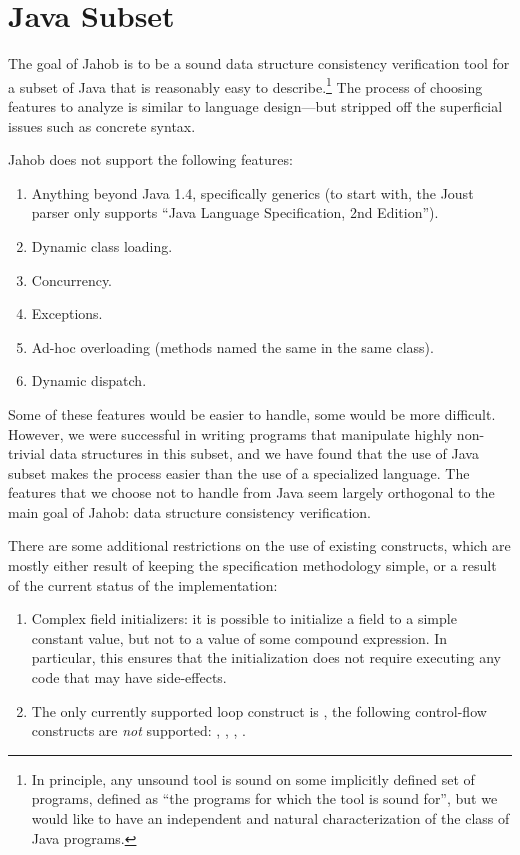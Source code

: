 \section{Java Subset}
\label{sec:javaSubset}

The goal of Jahob is to be a sound data structure consistency
verification tool for a subset of Java that is reasonably easy to
describe.\footnote{In principle, any unsound tool is sound on some
implicitly defined set of programs, defined as ``the programs for
which the tool is sound for'', but we would like to have an
independent and natural characterization of the class of Java
programs.}  The process of choosing features to analyze is similar to
language design---but stripped off the superficial issues such as
concrete syntax.

Jahob does not support the following features:
\begin{enumerate}
\item Anything beyond Java 1.4, specifically generics (to start with,
the Joust parser only supports ``Java Language Specification, 2nd Edition'').
\item Dynamic class loading.
\item Concurrency.
\item Exceptions.
\item Ad-hoc overloading (methods named the same in the same class).
\item Dynamic dispatch.
\end{enumerate}
Some of these features would be easier to handle, some would be more
difficult.  However, we were successful in writing programs that
manipulate highly non-trivial data structures in this subset, and we
have found that the use of Java subset makes the process easier than
the use of a specialized language.  The features that we choose not to
handle from Java seem largely orthogonal to the main goal of Jahob:
data structure consistency verification.

There are some additional restrictions on the use of
existing constructs, which are mostly either result of
keeping the specification methodology simple, or a result of
the current status of the implementation:
\begin{enumerate}
\item Complex field initializers: it is possible to initialize
a field to a simple constant value, but not to a value of some
compound expression.  In particular, this ensures that the initialization
does not require executing any code that may have side-effects.
\item The only currently supported loop construct is ,
     the following control-flow constructs are \emph{not} supported: 
     , , , .
\end{enumerate}

